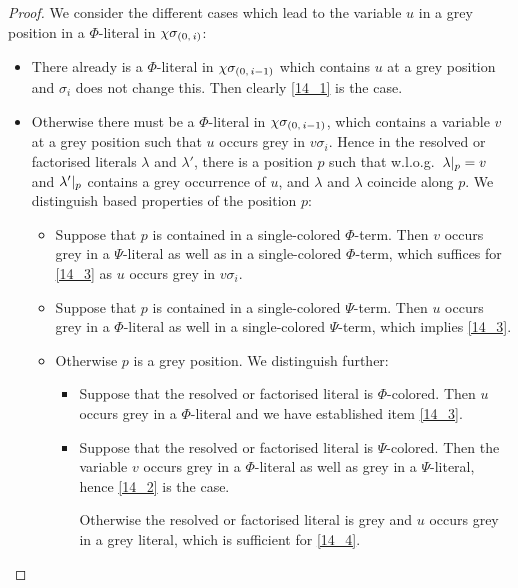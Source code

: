 \documentclass[,%
	draft=false,%
	numbers=noendperiod
	12pt,
	a4paper,
	oneside,%
	openany,
]{memoir}
\begin{document}
\begin{proof}
	We consider the different cases which lead to the variable $u$ in a grey position in a $\Phi$-literal in $\chi\sigma_{(0,\,i)}$:
	\begin{itemize}
		\item
			There already is a $\Phi$-literal in $\chi\sigma_{(0,\,i-1)}$ which contains $u$ at a grey position and $\sigma_i$ does not change this. Then clearly \ref{14_1} is the case.

		\item
			Otherwise there must be a $\Phi$-literal in $\chi\sigma_{(0,\,i-1)}$, which contains a variable $v$ at a grey position such that $u$ occurs grey in $v\sigma_i$.
			Hence in the resolved or factorised literals $\lambda$ and $\lambda'$, there is a position $p$ such that w.l.o.g.\ $\lambda|_{p} = v$ and $\lambda'|_{p}$ contains a grey occurrence of $u$, and $\lambda$ and $\lambda$ coincide along $p$.
			We distinguish based properties of the position $p$:

			\begin{itemize}
				\item
					Suppose that $p$ is contained in a single-colored $\Phi$-term.
					Then $v$ occurs grey in a $\Psi$-literal as well as in a single-colored $\Phi$-term, which suffices for \ref{14_3} as $u$ occurs grey in $v\sigma_i$.

				\item 
					Suppose that $p$ is contained in a single-colored $\Psi$-term.
					Then $u$ occurs grey in a $\Phi$-literal as well in a single-colored $\Psi$-term, which implies \ref{14_3}.

				\item
					Otherwise $p$ is a grey position.
					We distinguish further:

					\begin{itemize}
						\item Suppose that the resolved or factorised literal is $\Phi$-colored.
							Then $u$ occurs grey in a $\Phi$-literal and we have established item \ref{14_3}.

						\item Suppose that the resolved or factorised literal is $\Psi$-colored.
							Then the variable $v$ occurs grey in a $\Phi$-literal as well as grey in a $\Psi$-literal, hence \ref{14_2} is the case.

							Otherwise the resolved or factorised literal is grey and $u$ occurs grey in a grey literal, which is sufficient for \ref{14_4}.
							\qedhere
					\end{itemize}

			\end{itemize}

	\end{itemize}

\end{proof}
\end{document}
